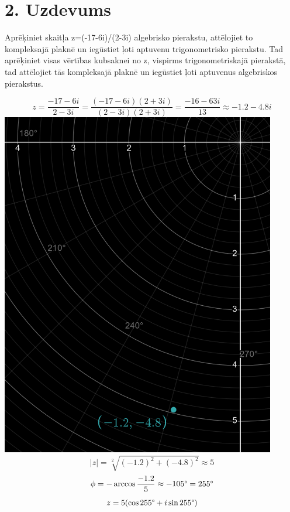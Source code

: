 \documentclass{article}
\begin{document}
\section*{2. Uzdevums}
Aprēķiniet skaitļa z=(-17-6i)/(2-3i) algebrisko pierakstu, attēlojiet to kompleksajā plaknē un iegūstiet ļoti aptuvenu trigonometrisko pierakstu. Tad aprēķiniet visas vērtības kubsaknei no z, vispirms trigonometriskajā pierakstā, tad attēlojiet tās kompleksajā plaknē un iegūstiet ļoti aptuvenus algebriskos pierakstus.

\begin{equation*}
    z = \frac{-17 - 6i}{2 - 3i} = \frac{(-17 - 6i)(2 + 3i)}{(2 - 3i)(2 + 3i)} = \frac{-16 - 63i}{13} \approx -1.2 - 4.8i
\end{equation*}
\includegraphics[width=0.9\textwidth, center]{2}
\begin{equation*}
    |z| = \sqrt[2]{(-1.2)^2 + (-4.8)^2} \approx 5
\end{equation*}
\begin{equation*}
    \phi = - \arccos \frac{-1.2}{5} \approx - 105 \degree = 255 \degree
\end{equation*}
\begin{equation*}
    z = 5(\cos 255 \degree + i \sin 255 \degree)
\end{equation*}
\end{document}
